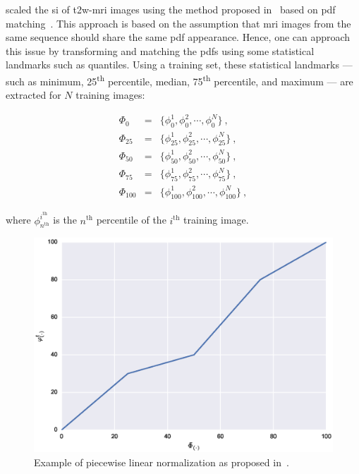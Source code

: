 \citeauthor{Lv2009} scaled the \ac{si} of \ac{t2w}-\ac{mri} images using the method proposed in~\cite{Nyul2000} based on \ac{pdf} matching~\cite{Lv2009}.
This approach is based on the assumption that \ac{mri} images from the same sequence should share the same \ac{pdf} appearance.
Hence, one can approach this issue by transforming and matching the \acp{pdf} using some statistical landmarks such as quantiles.
Using a training set, these statistical landmarks --- such as minimum, 25\textsuperscript{th} percentile, median, 75\textsuperscript{th} percentile, and maximum --- are extracted for $N$ training images:

\begin{eqnarray}	
	\Phi_{0} & = & \{ \phi_{0}^{1}, \phi_{0}^{2}, \cdots, \phi_{0}^{N} \} \ , \nonumber \\
	\Phi_{25} & = & \{ \phi_{25}^{1}, \phi_{25}^{2}, \cdots, \phi_{25}^{N} \} \ , \nonumber \\
	\Phi_{50} & = & \{ \phi_{50}^{1}, \phi_{50}^{2}, \cdots, \phi_{50}^{N} \} \ ,  \label{eq:quantileStd} \\
	\Phi_{75} & = & \{ \phi_{75}^{1}, \phi_{75}^{2}, \cdots, \phi_{75}^{N} \} \ , \nonumber \\
	\Phi_{100} & = & \{ \phi_{100}^{1}, \phi_{100}^{2}, \cdots, \phi_{100}^{N} \} \ , \nonumber
\end{eqnarray}

\noindent where $\phi_{n^\text{th}}^{i^{\text{th}}}$ is the $n^{\text{th}}$ percentile of the $i^{\text{th}}$ training image.

\begin{figure}
	\centering
	\includegraphics[width=0.7\linewidth]{3_review/figures/processing/pre-processing/normalization/linear_transform_parts.eps}
	\caption{Example of piecewise linear normalization as proposed in~\cite{Nyul2000}.}
	\label{fig:imnorm}
\end{figure}

